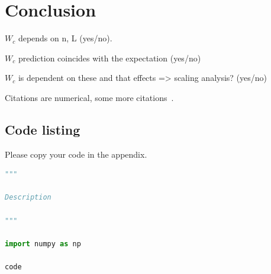 \documentclass[reprint,amsmath,amssymb,aps,prb]{revtex4-2}
\begin{document}
\section{Conclusion}%

$W_c$ depends on n, L (yes/no).

$W_c$ prediction coincides with the expectation (yes/no)

$W_c$ is dependent on these and that effects => scaling analysis? (yes/no)

Citations are numerical\cite{epr}, some more citations~\cite{feyn54,Bire82,Berman1983,witten2001,Davies1998}. 




\appendix


\begin{widetext}
\section{Code listing} \label{app:codes}
Please copy your code in the appendix.
\begin{lstlisting}[language=Python]
"""

Description

"""

import numpy as np

code
\end{lstlisting}
\end{widetext}
\end{document}
